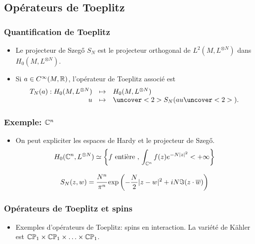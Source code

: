 \documentclass[mathserif]{beamer}
\begin{document}
\subsection{Op\'erateurs de Toeplitz}


  \begin{frame}
    \frametitle{Quantification de Toeplitz}
    \begin{defn}
      \begin{itemize}
      \item Le projecteur de Szeg\H{o} $S_N$ est le projecteur orthogonal de
      $L^2(M,L^{\otimes N})$ dans $H_0(M,L^{\otimes N})$.
    
    \item Si $a\in C^{\infty}(M,\mathbb{R})$, l'op\'erateur de Toeplitz
      associ\'e est
      \[
        \begin{array}{rcl}
        T_N(a):H_0(M,L^{\otimes N})&\mapsto&
                                             H_0(M,L^{\otimes N})\\
        u &\mapsto& \uncover<2>{S_N(}au\uncover<2>{)}.
        \end{array}
      \]
      \end{itemize}
    \end{defn}
  \end{frame}

  \begin{frame}
    \frametitle{Exemple: $\mathbb{C}^n$}
    \begin{itemize}
    \item 
    On peut expliciter les espaces de Hardy et le projecteur de
    Szeg\H{o}.
    \[H_0(\mathbb{C}^n,L^{\otimes N})\simeq \left\{f\text{ enti\`ere
        },\, \int_{\mathbb{C}^n}f(z)e^{-N|z|^2}<+\infty\right\}\]

      \[S_N(z,w)=\cfrac{N^n}{\pi^n}\exp\left(-\frac N2|z-w|^2+iN\Im(z\cdot \overline{w})\right)\]
\end{itemize}
\end{frame}

\begin{frame}
  \frametitle{Opérateurs de Toeplitz et spins}
  \begin{itemize}
  \item Exemples d'opérateurs de Toeplitz: spins en interaction. La
    variété de K\"ahler est $\mathbb{C}\mathbb{P}_1\times \mathbb{C}\mathbb{P}_1\times
    \ldots \times \mathbb{C}\mathbb{P}_1$.
  \end{itemize}
\end{frame}
\end{document}
